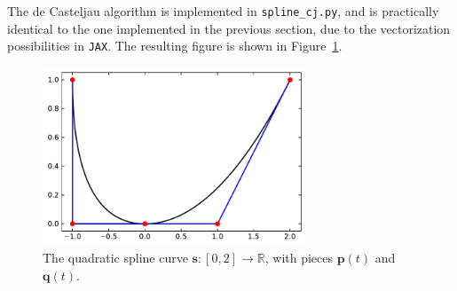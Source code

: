 \begin{solution}
    The de Casteljau algorithm is implemented in \verb|spline_cj.py|, and is practically identical to the one implemented in the previous section, due to the vectorization possibilities in \verb|JAX|.
    The resulting figure is shown in Figure~\ref{fig:bezier_spline}.
    \begin{figure}[ht]
        \centering
        \includegraphics[width=0.7\textwidth]{2_splines_in_bb/bezier_casteljau.pdf}
        \caption{The quadratic spline curve $\mathbf{s} : [0, 2] \to \mathbb{R}$, with pieces $\mathbf{p}(t)$ and $\mathbf{q}(t)$.\label{fig:bezier_spline}}
    \end{figure}
\end{solution}